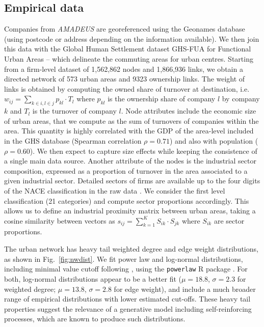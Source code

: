 \documentclass[10pt,letterpaper]{article}
\begin{document}
\subsection*{Empirical data}


Companies from \emph {AMADEUS} are georeferenced using the Geonames database (using postcode or address depending on the information available). We then join this data with the Global Human Settlement dataset GHS-FUA for Functional Urban Areas \cite{Florczyk2019ghs} -- which delineate the commuting areas for urban centres. Starting from a firm-level dataset of 1,562,862 nodes and 1,866,936 links, we obtain a directed network of 573 urban areas and 9323 ownership links. The weight of links is obtained by computing the owned share of turnover at destination, i.e. $w_{ij} = \sum_{k \in i,l \in j} p_{kl} \cdot T_l$ where $p_{kl}$ is the ownership share of company $l$ by company $k$ and $T_l$ is the turnover of company $l$. Node attributes include the economic size of urban areas, that we compute as the sum of turnovers of companies within the area. This quantity is highly correlated with the GDP of the area-level included in the GHS database (Spearman correlation $\rho = 0.71$) and also with population ($\rho = 0.60$). We then expect to capture size effects while keeping the consistence of a single main data source. Another attribute of the nodes is the industrial sector composition, expressed as a proportion of turnover in the area associated to a given industrial sector. Detailed sectors of firms are available up to the four digits of the NACE classification in the raw data \cite{EUROSTAT2008}. We consider the first level classification (21 categories) and compute sector proportions accordingly. This allows us to define an industrial proximity matrix between urban areas, taking a cosine similarity between vectors as $s_{ij} = \sum_{k=1}^{K} S_{ik}\cdot S_{jk}$ where $S_{ik}$ are sector proportions.


The urban network has heavy tail weighted degree and edge weight distributions, as shown in Fig.~\ref{fig:nwdist}. We fit power law and log-normal distributions, including minimal value cutoff following \cite{clauset2009power}, using the \texttt{powerlaw} R package \cite{powerlawpackage}. For both, log-normal distributions appear to be a better fit ($\mu=18.8$, $\sigma=2.3$ for weighted degree; $\mu=13.8$, $\sigma=2.8$ for edge weight), and include a much broader range of empirical distributions with lower estimated cut-offs. These heavy tail properties suggest the relevance of a generative model including self-reinforcing processes, which are known to produce such distributions.
\end{document}
